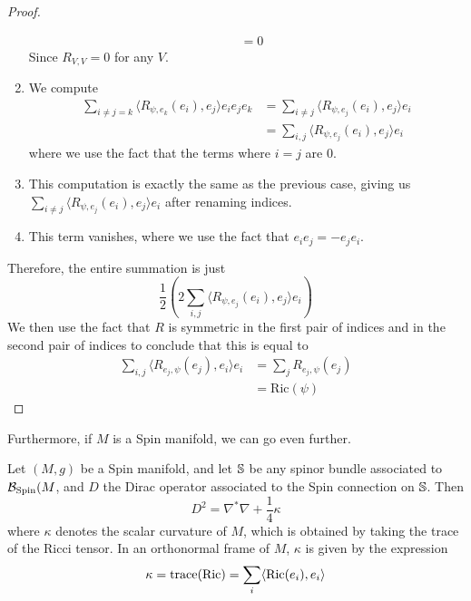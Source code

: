 \begin{proof}
\begin{enumerate}
\begin{align*}
  &= 0
  \end{align*}
  Since $R_{V,V} = 0$ for any $V$.
  \item We compute
  \begin{align*}
  \sum_{i \neq j = k}\langle R_{\psi,e_k}(e_i), e_j\rangle e_ie_je_k
  &= \sum_{i \neq j} \langle R_{\psi, e_j}(e_i), e_j\rangle e_i \\
  &= \sum_{i,j} \langle R_{\psi, e_j}(e_i), e_j \rangle e_i
  \end{align*}
  where we use the fact that the terms where $i = j$ are $0$.
  \item This computation is exactly the same as the previous case, giving us
  $\sum_{i \neq j} \langle R_{\psi, e_j}(e_i), e_j \rangle e_i$ after renaming indices.
  \item This term vanishes, where we use the fact that $e_ie_j = -e_je_i$.
\end{enumerate}
Therefore, the entire summation is just
\[
\frac{1}{2} \left( 2\sum_{i, j}\langle R_{\psi, e_j}(e_i), e_j \rangle e_i \right)
\]
We then use the fact that $R$ is symmetric in the first pair of indices and in
the second pair of indices to conclude that this is equal to
\begin{align*}
\sum_{i,j}\langle R_{e_j,\psi}(e_j), e_i \rangle e_i &= \sum_j R_{e_j, \psi}(e_j) \\
&= \mathrm{Ric}(\psi)
\end{align*}
\end{proof}
Furthermore, if $M$ is a Spin manifold, we can go even further.
%
\begin{thm}[\ib{Lichnerowicz}]
Let $(M,g)$ be a Spin manifold, and let $\S$ be any spinor bundle associated to
$\B_{\Spin}(M$, and $D$ the Dirac operator associated to the Spin connection on $\S$.
Then
\[
D^2 = \nabla^*\nabla + \frac{1}{4}\kappa
\]
where $\kappa$ denotes the scalar curvature of $M$, which is obtained by taking
the trace of the Ricci tensor. In an orthonormal frame of $M$, $\kappa$ is given by
the expression
\[
\kappa = \trace(\mathrm{Ric}) = \sum_{i} \langle \mathrm{Ric}(e_i), e_i \rangle
\]
\end{thm}
%
